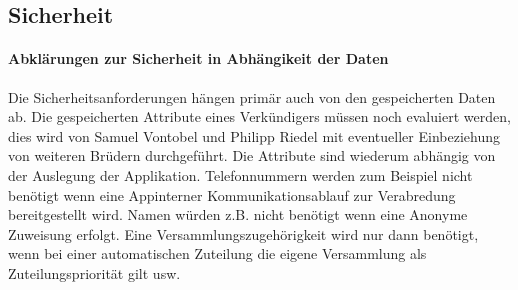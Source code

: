 
\subsection{Sicherheit}
\paragraph{Abklärungen zur Sicherheit in Abhängikeit der Daten} Die Sicherheitsanforderungen hängen primär auch von den gespeicherten Daten ab. Die gespeicherten Attribute eines Verkündigers müssen noch evaluiert werden, dies wird von Samuel Vontobel und Philipp Riedel mit eventueller Einbeziehung von weiteren Brüdern durchgeführt. Die Attribute sind wiederum abhängig von der Auslegung der Applikation. Telefonnummern werden zum Beispiel nicht benötigt wenn eine Appinterner Kommunikationsablauf zur Verabredung bereitgestellt wird. Namen würden z.B. nicht benötigt wenn eine Anonyme Zuweisung erfolgt. Eine Versammlungszugehörigkeit wird nur dann benötigt, wenn bei einer automatischen Zuteilung die eigene Versammlung als Zuteilungspriorität gilt usw. 

\newline

